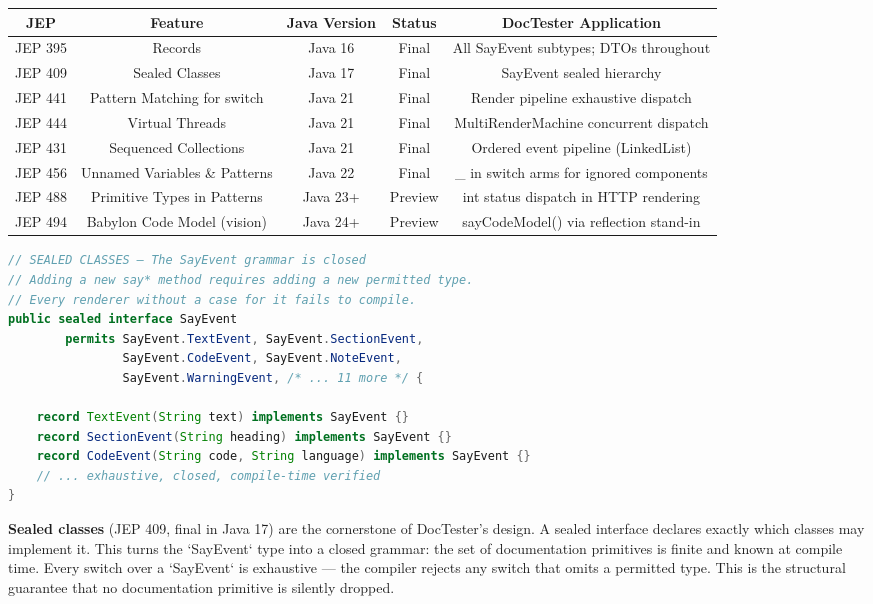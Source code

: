 \documentclass[11pt]{article}
\begin{document}
\begin{table}[h]
\centering
\begin{tabular}{|c|c|c|c|c|}
\hline
\textbf{JEP} & \textbf{Feature} & \textbf{Java Version} & \textbf{Status} & \textbf{DocTester Application} \\
\hline
JEP 395 & Records & Java 16 & Final & All SayEvent subtypes; DTOs throughout \\
JEP 409 & Sealed Classes & Java 17 & Final & SayEvent sealed hierarchy \\
JEP 441 & Pattern Matching for switch & Java 21 & Final & Render pipeline exhaustive dispatch \\
JEP 444 & Virtual Threads & Java 21 & Final & MultiRenderMachine concurrent dispatch \\
JEP 431 & Sequenced Collections & Java 21 & Final & Ordered event pipeline (LinkedList) \\
JEP 456 & Unnamed Variables \& Patterns & Java 22 & Final & \_ in switch arms for ignored components \\
JEP 488 & Primitive Types in Patterns & Java 23+ & Preview & int status dispatch in HTTP rendering \\
JEP 494 & Babylon Code Model (vision) & Java 24+ & Preview & sayCodeModel() via reflection stand-in \\
\hline
\end{tabular}
\end{table}

\cite{JEP441}
\cite{JEP444}
\cite{JEP431}
\cite{JEP456}

\begin{lstlisting}[language=java]
// SEALED CLASSES — The SayEvent grammar is closed
// Adding a new say* method requires adding a new permitted type.
// Every renderer without a case for it fails to compile.
public sealed interface SayEvent
        permits SayEvent.TextEvent, SayEvent.SectionEvent,
                SayEvent.CodeEvent, SayEvent.NoteEvent,
                SayEvent.WarningEvent, /* ... 11 more */ {

    record TextEvent(String text) implements SayEvent {}
    record SectionEvent(String heading) implements SayEvent {}
    record CodeEvent(String code, String language) implements SayEvent {}
    // ... exhaustive, closed, compile-time verified
}
\end{lstlisting}


\textbf{Sealed classes} (JEP 409, final in Java 17) are the cornerstone of DocTester's design. A sealed interface declares exactly which classes may implement it. This turns the `SayEvent` type into a closed grammar: the set of documentation primitives is finite and known at compile time. Every switch over a `SayEvent` is exhaustive — the compiler rejects any switch that omits a permitted type. This is the structural guarantee that no documentation primitive is silently dropped.
\cite[p. Chapter 8]{Gosling2023}
\end{document}
